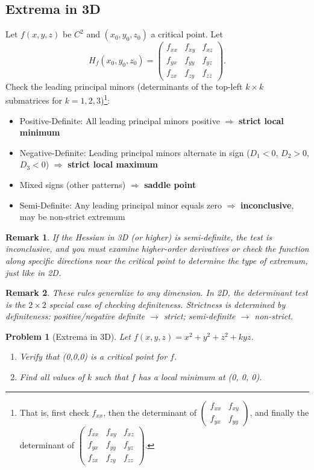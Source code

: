 \documentclass{article}
\newtheorem{problem}{Problem}
\newtheorem{remark}{Remark}
\begin{document}
\subsection{Extrema in 3D}
Let $f(x,y,z)$ be $C^2$ and $(x_0,y_0,z_0)$ a critical point. Let
\[H_f(x_0,y_0,z_0) = \begin{pmatrix} f_{xx} & f_{xy} & f_{xz} \\ f_{yx} & f_{yy} & f_{yz} \\ f_{zx} & f_{zy} & f_{zz}\end{pmatrix}.
\]
Check the leading principal minors (determinants of the top-left $k\times k$ submatrices for $k=1,2,3$)\footnote{That is, first check $f_{xx}$, then the determinant of $\begin{pmatrix}f_{xx} & f_{xy}\\f_{yx} & f_{yy}\end{pmatrix}$, and finally the determinant of $\begin{pmatrix}f_{xx} & f_{xy} & f_{xz} \\ f_{yx} & f_{yy} & f_{yz} \\ f_{zx} & f_{zy} & f_{zz}\end{pmatrix}$.}:
\begin{itemize}
    \item Positive-Definite: All leading principal minors positive $\Rightarrow$ \textbf{strict local minimum}
    \item Negative-Definite: Leading principal minors alternate in sign ($D_1 < 0$, $D_2 > 0$, $D_3 < 0$) $\Rightarrow$ \textbf{strict local maximum}
    \item Mixed signs (other patterns) $\Rightarrow$ \textbf{saddle point}
    \item Semi-Definite: Any leading principal minor equals zero $\Rightarrow$ \textbf{inconclusive}, may be non-strict extremum
\end{itemize}
\begin{remark}
    If the Hessian in 3D (or higher) is semi-definite, the test is inconclusive, and you must examine higher-order derivatives or check the function along specific directions near the critical point to determine the type of extremum, just like in 2D.
\end{remark}
\begin{remark}
    These rules generalize to any dimension. In 2D, the determinant test is the \(2 \times 2\) special case of checking definiteness. Strictness is determined by definiteness: positive/negative definite $\to$ strict; semi-definite $\to$ non-strict.
\end{remark}
\begin{problem}[Extrema in 3D]
    Let \(f(x,y,z) = x^2 + y^2 + z^2 + kyz\).
    \begin{enumerate}[label=(\alph*)]
        \item Verify that (0,0,0) is a critical point for \(f\).
        \item Find all values of \(k\) such that \(f\) has a local minimum at (0, 0, 0).
    \end{enumerate}
\end{problem}
\end{document}
